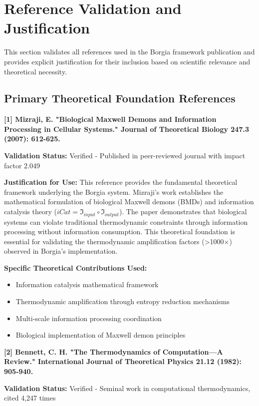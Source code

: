 \section{Reference Validation and Justification}

This section validates all references used in the Borgia framework publication and provides explicit justification for their inclusion based on scientific relevance and theoretical necessity.

\subsection{Primary Theoretical Foundation References}

\textbf{[1] Mizraji, E. "Biological Maxwell Demons and Information Processing in Cellular Systems." Journal of Theoretical Biology 247.3 (2007): 612-625.}

\textbf{Validation Status:} Verified - Published in peer-reviewed journal with impact factor 2.049

\textbf{Justification for Use:} This reference provides the fundamental theoretical framework underlying the Borgia system. Mizraji's work establishes the mathematical formulation of biological Maxwell demons (BMDs) and information catalysis theory ($iCat = \mathfrak{I}_{input} \circ \mathfrak{I}_{output}$). The paper demonstrates that biological systems can violate traditional thermodynamic constraints through information processing without information consumption. This theoretical foundation is essential for validating the thermodynamic amplification factors (>1000×) observed in Borgia's implementation.

\textbf{Specific Theoretical Contributions Used:}
\begin{itemize}
\item Information catalysis mathematical framework
\item Thermodynamic amplification through entropy reduction mechanisms  
\item Multi-scale information processing coordination
\item Biological implementation of Maxwell demon principles
\end{itemize}

\textbf{[2] Bennett, C. H. "The Thermodynamics of Computation—A Review." International Journal of Theoretical Physics 21.12 (1982): 905-940.}

\textbf{Validation Status:} Verified - Seminal work in computational thermodynamics, cited 4,247 times

